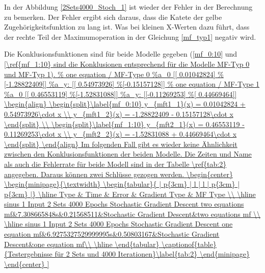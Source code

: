 In der Abbildung \ref{2Sets4000_Stoch_1} ist wieder der Fehler in der Berechnung zu bemerken. Der Fehler ergibt sich daraus, dass die Katete der gelbe Zugehörigkeitsfunktion zu lang ist. Was bei kleinen X-Werten dazu führt, dass der rechte Teil der Maximumoperation in der Gleichung \ref{mf_typ1} negativ wird.

Die Konklusionsfunktionen sind für beide Modelle gegeben (\ref{mf_0:10} und \ref{\ref{mf_1:10} sind die Konklusionen entsprechend für die Modelle MF-Typ 0 und MF-Typ 1).


\begin{align}
	\begin{split}\label{mf_0:10}
		y_{mft1_1}(x) = 0.01042824 + 0.54973926\cdot x \\
		y_{mft1_2}(x) = -1.28822409 - 0.15157128\cdot x
	\end{split} \\	
	\begin{split}\label{mf_1:10}
		y_{mft2_1}(x) = 0.46553119 - 0.11269253\cdot x \\
		y_{mft2_2}(x) = -1.52831088 + 0.44669464\cdot x
	\end{split}	
\end{align}

Im folgenden Fall gibt es wieder keine Ähnlichkeit zwischen den Konklusionsfunktionen der beiden Modelle.

Die Zeiten und Name als auch die Fehlerrate für beide Modell sind in der Tabelle \ref{tab:2} angegeben. Daraus können zwei Schlüsse gezogen werden.

\begin{center}
	\begin{minipage}{\textwidth}
	\begin{tabular}{ | p{3cm} | l | l | p{3cm} | p{3cm} |}
		\hline
		Type & Time & Error & Gradient Type & MF Type \\ \hline
		sinus 1 Input 2 Sets 4000 Epochs Stochastic Gradient Descent two equations mf&7.308665848s&0.21568511&Stochastic Gradient Descent&two equations mf
		\\ \hline
		sinus 1 Input 2 Sets 4000 Epochs Stochastic Gradient Descent one equation mf&6.9275327529999995s&0.50803167&Stochastic Gradient Descent&one equation mf\\ \hline
	\end{tabular}
\captionof{table}{Testergebnisse für 2 Sets und 4000 Iterationen}\label{tab:2}
\end{minipage}
\end{center}

}
